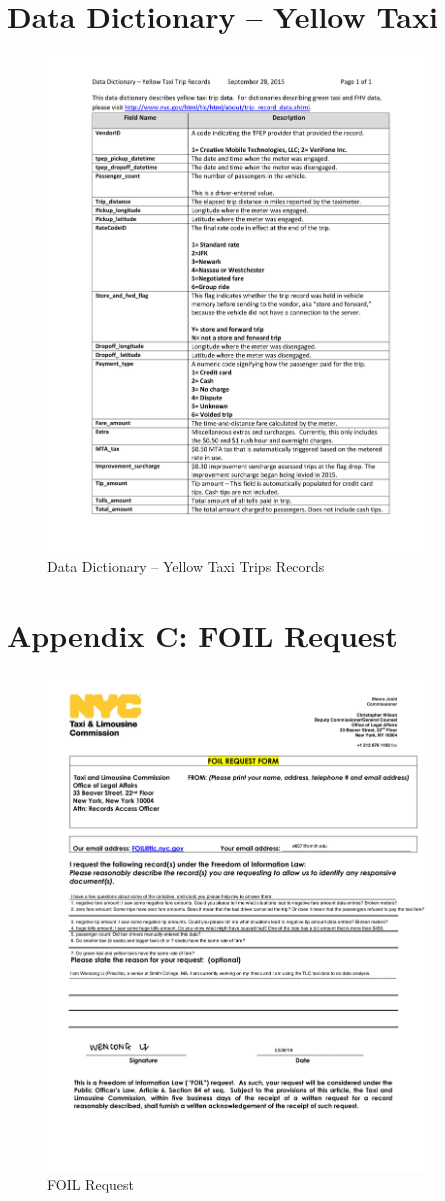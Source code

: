 \documentclass[12pt,twoside]{reedthesis}
\theoremstyle{definition}
\theoremstyle{definition}
\theoremstyle{definition}
\theoremstyle{remark}
\begin{document}
\chapter{Data Dictionary -- Yellow
Taxi}\label{data-dictionary-yellow-taxi}
\begin{figure}
  \centering
  \includegraphics[width=4in]{figure/data_dictionary_trip_records_yellow.pdf}
  \caption{Data Dictionary -- Yellow Taxi Trips Records}
\end{figure}
\chapter{Appendix C: FOIL Request}\label{appendix-c-foil-request}
\begin{figure}
  \centering
  \includegraphics[width=4in]{figure/appendix_foil_form_doc.pdf}
  \caption{FOIL Request}
\end{figure}
\end{document}
